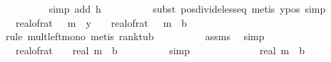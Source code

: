 \begin{isabellebody}
\ \ \ \ \ \ \ \ \isamarkupfalse%
\ {\isacharparenleft}{\kern0pt}simp\ add{\isacharcolon}{\kern0pt}\ h{\isacharunderscore}{\kern0pt}{}{\isacharparenright}{\kern0pt}\isanewline
\ \ \ \ \ \ \ \ \isamarkupfalse%
\ {\isacharparenleft}{\kern0pt}subst\ pos{\isacharunderscore}{\kern0pt}divide{\isacharunderscore}{\kern0pt}less{\isacharunderscore}{\kern0pt}eq{\isacharcomma}{\kern0pt}\ metis\ y{\isacharprime}{\kern0pt}{\isacharunderscore}{\kern0pt}pos{\isacharcomma}{\kern0pt}\ simp{\isacharparenright}{\kern0pt}\isanewline
\ \ \ \ \ \ \isamarkupfalse%
\ {\isachardoublequoteopen}{\isacharparenleft}{\kern0pt}{}\ {\isacharminus}{\kern0pt}\ real{\isacharunderscore}{\kern0pt}of{\isacharunderscore}{\kern0pt}rat\ {\isasymdelta}{\isacharparenright}{\kern0pt}\ {\isacharasterisk}{\kern0pt}\ m\ {\isacharasterisk}{\kern0pt}\ y{\isacharprime}{\kern0pt}\ {\isasymle}\ {\isacharparenleft}{\kern0pt}{}\ {\isacharminus}{\kern0pt}\ real{\isacharunderscore}{\kern0pt}of{\isacharunderscore}{\kern0pt}rat\ {\isasymdelta}{\isacharparenright}{\kern0pt}\ {\isacharasterisk}{\kern0pt}\ m\ {\isacharasterisk}{\kern0pt}\ b{\isachardoublequoteclose}\ \isanewline
\ \ \ \ \ \ \ \ \isamarkupfalse%
\ {\isacharparenleft}{\kern0pt}rule\ mult{\isacharunderscore}{\kern0pt}left{\isacharunderscore}{\kern0pt}mono{\isacharcomma}{\kern0pt}\ metis\ rank{\isacharunderscore}{\kern0pt}t{\isacharunderscore}{\kern0pt}ub{\isacharprime}{\kern0pt}{\isacharparenright}{\kern0pt}\isanewline
\ \ \ \ \ \ \ \ \isamarkupfalse%
\ assms\ \isamarkupfalse%
\ simp\isanewline
\ \ \ \ \ \ \isamarkupfalse%
\ \isamarkupfalse%
\ {\isachardoublequoteopen}{\isachardot}{\kern0pt}{\isachardot}{\kern0pt}{\isachardot}{\kern0pt}\ {\isacharequal}{\kern0pt}\ {\isacharparenleft}{\kern0pt}{\isacharparenleft}{\kern0pt}{}{\isacharminus}{\kern0pt}real{\isacharunderscore}{\kern0pt}of{\isacharunderscore}{\kern0pt}rat\ {\isasymdelta}{\isacharparenright}{\kern0pt}{\isacharparenright}{\kern0pt}\ \ {\isacharasterisk}{\kern0pt}\ {\isacharparenleft}{\kern0pt}real\ m\ {\isacharasterisk}{\kern0pt}\ b{\isacharparenright}{\kern0pt}{\isachardoublequoteclose}\isanewline
\ \ \ \ \ \ \ \ \isamarkupfalse%
\ simp\isanewline
\ \ \ \ \ \ \isamarkupfalse%
\ \isamarkupfalse%
\ {\isachardoublequoteopen}{\isachardot}{\kern0pt}{\isachardot}{\kern0pt}{\isachardot}{\kern0pt}\ {\isacharless}{\kern0pt}\ {\isacharparenleft}{\kern0pt}{}{\isacharminus}{\kern0pt}{\isasymdelta}{\isacharprime}{\kern0pt}{\isacharparenright}{\kern0pt}\ {\isacharasterisk}{\kern0pt}\ {\isacharparenleft}{\kern0pt}real\ m\ {\isacharasterisk}{\kern0pt}\ b{\isacharparenright}{\kern0pt}{\isachardoublequoteclose}\ \isanewline

\end{isabellebody}
